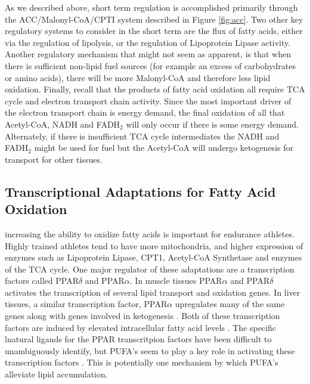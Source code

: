 \documentclass{tufte-handout}
\begin{document}
As we described above, short term regulation is accomplished primarily through the ACC/Malonyl-CoA/CPTI system described in Figure \ref{fig:acc}.  Two other key regulatory systems to consider in the short term are the flux of fatty acids, either via the regulation of lipolysis, or the regulation of Lipoprotein Lipase activity.  Another regulatory mechanism that might not seem as apparent, is that when there is sufficient non-lipid fuel sources (for example an excess of carbohydrates or amino acids), there will be more Malonyl-CoA and therefore less lipid oxidation.  Finally, recall that the products of fatty acid oxidation all require TCA cycle and electron transport chain activity.  Since the most important driver of the electron transport chain is energy demand, the final oxidation of all that Acetyl-CoA, NADH and FADH$_2$ will only occur if there is some energy demand.   Alternately, if there is insufficient TCA cycle intermediates the NADH and FADH$_2$ might be used for fuel but the Acetyl-CoA will undergo ketogenesis for transport for other tissues.

\subsection{Transcriptional Adaptations for Fatty Acid Oxidation}

 increasing the ability to oxidize fatty acids is important for endurance athletes.  Highly trained athletes tend to have more mitochondria, and higher expression of enzymes such as Lipoprotein Lipase, CPT1, Acetyl-CoA Synthetase and enzymes of the TCA cycle.  One major regulator of these adaptations are a transcription factors called PPAR$\delta$ and PPAR$\alpha$.  In muscle tissues PPAR$\alpha$ and PPAR$\delta$  activates the transcription of several lipid transport and oxidation genes.  In liver tissues, a similar transcription factor, PPAR$\alpha$ upregulates many of the same genes along with genes involved in ketogenesis \citep{Kersten2000,Badman2007}.  Both of these transcription factors are induced by elevated intracellular fatty acid levels \citep{Keller1993}.  The specific lnatural ligands for the PPAR transcritpion factors have been difficult to unambiguously identify, but PUFA's seem to play a key role in activating these transcription factors \citep{Forman1997}.  This is potentially one mechanism by which PUFA's alleviate lipid accumulation.
\end{document}
